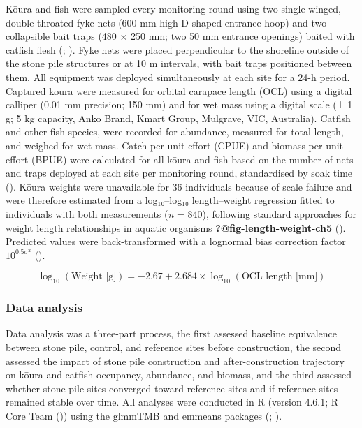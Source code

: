 \documentclass[
  letterpaper,
  DIV=11,
  numbers=noendperiod]{scrartcl}
\begin{document}
Kōura and fish were sampled every monitoring round using two
single-winged, double-throated fyke nets (600 mm high D-shaped entrance
hoop) and two collapsible bait traps (480 × 250 mm; two 50 mm entrance
openings) baited with catfish flesh (; ). Fyke nets were
placed perpendicular to the shoreline outside of the stone pile
structures or at 10 m intervals, with bait traps positioned between
them. All equipment was deployed simultaneously at each site for a 24-h
period. Captured kōura were measured for orbital carapace length (OCL)
using a digital calliper (0.01 mm precision; 150 mm) and for wet mass
using a digital scale (± 1 g; 5 kg capacity, Anko Brand, Kmart Group,
Mulgrave, VIC, Australia). Catfish and other fish species, were recorded
for abundance, measured for total length, and weighed for wet mass.
Catch per unit effort (CPUE) and biomass per unit effort (BPUE) were
calculated for all kōura and fish based on the number of nets and traps
deployed at each site per monitoring round, standardised by soak time
(). Kōura weights
were unavailable for 36 individuals because of scale failure and were
therefore estimated from a log₁₀--log₁₀ length--weight regression fitted
to individuals with both measurements (\emph{n} = 840), following
standard approaches for weight length relationships in aquatic organisms
{\textbf{?@fig-length-weight-ch5}} (). Predicted values were back-transformed with a lognormal bias
correction factor \(10^{0.5 \sigma^2}\) ().

\[
\log_{10}(\text{Weight [g]}) = -2.67 + 2.684 \times \log_{10}(\text{OCL length [mm]})
\]

\subsubsection{Data analysis}\label{data-analysis}

Data analysis was a three-part process, the first assessed baseline
equivalence between stone pile, control, and reference sites before
construction, the second assessed the impact of stone pile construction
and after-construction trajectory on kōura and catfish occupancy,
abundance, and biomass, and the third assessed whether stone pile sites
converged toward reference sites and if reference sites remained stable
over time. All analyses were conducted in R (version 4.6.1; R Core Team
()) using the glmmTMB and emmeans
packages (;
).
\end{document}
